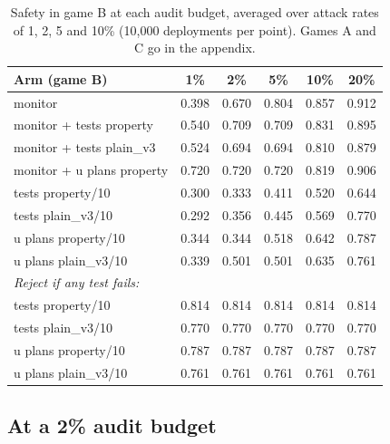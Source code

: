 \begin{table}[t]
\centering
\small
\begin{tabular}{lccccc}
\hline
Arm (game B) & 1\% & 2\% & 5\% & 10\% & 20\% \\
\hline
monitor                    & 0.398 & 0.670 & 0.804 & 0.857 & 0.912 \\
monitor + tests property   & 0.540 & 0.709 & 0.709 & 0.831 & 0.895 \\
monitor + tests plain\_v3  & 0.524 & 0.694 & 0.694 & 0.810 & 0.879 \\
monitor + u plans property & 0.720 & 0.720 & 0.720 & 0.819 & 0.906 \\
tests property/10          & 0.300 & 0.333 & 0.411 & 0.520 & 0.644 \\
tests plain\_v3/10         & 0.292 & 0.356 & 0.445 & 0.569 & 0.770 \\
u plans property/10        & 0.344 & 0.344 & 0.518 & 0.642 & 0.787 \\
u plans plain\_v3/10       & 0.339 & 0.501 & 0.501 & 0.635 & 0.761 \\
\hline
\multicolumn{6}{l}{\textit{Reject if any test fails:}} \\
tests property/10          & 0.814 & 0.814 & 0.814 & 0.814 & 0.814 \\
tests plain\_v3/10         & 0.770 & 0.770 & 0.770 & 0.770 & 0.770 \\
u plans property/10        & 0.787 & 0.787 & 0.787 & 0.787 & 0.787 \\
u plans plain\_v3/10       & 0.761 & 0.761 & 0.761 & 0.761 & 0.761 \\
\hline
\end{tabular}
\caption{Safety in game B at each audit budget, averaged over attack rates of
1, 2, 5 and 10\% (10{,}000 deployments per point). Games A and C go in the
appendix.}
\label{tab:sensitivity}
\end{table}

\subsection{At a 2\% audit budget}
\label{sec:paper-setting}

